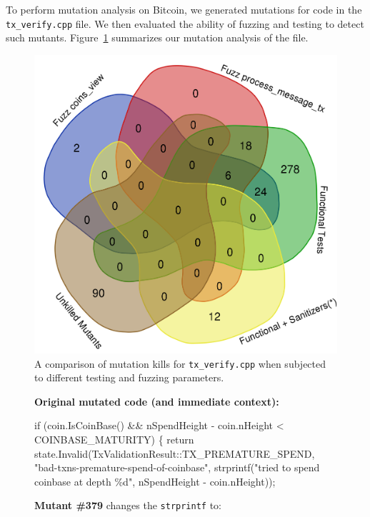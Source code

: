 \begin{sloppypar}

To perform mutation analysis on Bitcoin, we generated mutations for code in the
{\tt tx\_verify.cpp} file. We then evaluated the ability of fuzzing and testing
to detect such mutants. Figure~\ref{kills} summarizes our mutation
analysis of the file.

\begin{figure}
\vspace{2mm}
\includegraphics[width=0.9\columnwidth]{kill_pre_valgrind.png}
\caption{A comparison of mutation kills for {\tt tx\_verify.cpp} when subjected to different testing and fuzzing parameters.}
\label{kills}
\end{figure}

\begin{figure}
\raggedright
  
{\bf Original mutated code (and immediate context):}
  
\begin{code}
    if (coin.IsCoinBase() \&\& nSpendHeight - coin.nHeight < COINBASE\_MATURITY) \{
            return state.Invalid(TxValidationResult::TX\_PREMATURE\_SPEND, "bad-txns-premature-spend-of-coinbase",
                strprintf("tried to spend coinbase at depth \%d", nSpendHeight - coin.nHeight));
\end{code}

{\bf Mutant \#379} changes the {\tt strprintf} to:


\end{figure}
\end{sloppypar}
